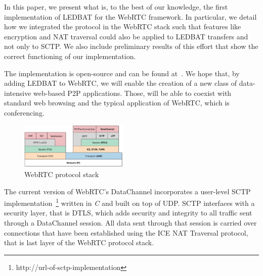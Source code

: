 \documentclass{sig-alternate}
\begin{document}
In this paper, we present what is, to the best of our knowledge, the first implementation
of LEDBAT for the WebRTC framework. In particular, we detail how we integrated the
protocol in the WebRTC stack such that features like encryption and NAT traversal could also 
be applied to LEDBAT transfers and not only to SCTP. We also include
preliminary results of this effort that show the correct functioning of our
implementation.

The implementation is open-source and can be found at~\cite{webrtc-utp}. We hope that, by
adding LEDBAT to WebRTC, we will enable the creation of a new class of data-intensive
web-based P2P applications. Those, will be able to coexist with standard web browsing and
the typical application of WebRTC, which is conferencing.



\begin{figure}[t]
  \centering
    \includegraphics[width=0.46\textwidth]{figs/architecture2}
\vspace*{-0.38cm}
	\caption{WebRTC protocol stack} \label{fig:architecture}
\vspace*{-0.4cm}
\end{figure}


The current version of WebRTC's DataChannel incorporates a user-level SCTP
implementation~\footnote{http://url-of-sctp-implementation} written in \textit{C} and built
on top of UDP. SCTP interfaces with a security layer, that is DTLS, which adds security
and integrity to all traffic sent through a DataChannel session.  All data sent through
that session is carried over connections that have been established using the ICE NAT
Traversal protocol, that is last layer of the WebRTC protocol stack.
\end{document}
